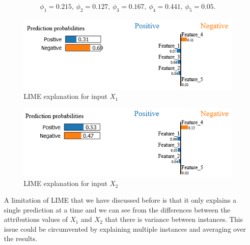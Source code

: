 \begin{align*}
    \phi_1 = 0.215, \ \phi_2 = 0.127, \ \phi_3 = 0.167 ,\ \phi_4 = 0.441, \ \phi_5 = 0.05.
\end{align*}
\begin  {figure}[!htpb]
  \includegraphics[width=\linewidth]{Evaluation_Images/lime-ground.png}
   \caption{LIME explanation for input $X_1$}
    \label{fig:lime-ground}
\end{figure}
\begin  {figure}[!htpb]
  \includegraphics[width=\linewidth]{Evaluation_Images/lime-ground2.png}
   \caption{LIME explanation for input $X_2$}
    \label{fig:lime-ground2}
\end{figure}
A limitation of LIME that we have discussed before is that it only explains a single prediction at a time and we can see from the differences between the attributions values of $X_1$ and $X_2$  that there is variance between instances. This issue could be circumvented by  explaining multiple instances and averaging over the results.


